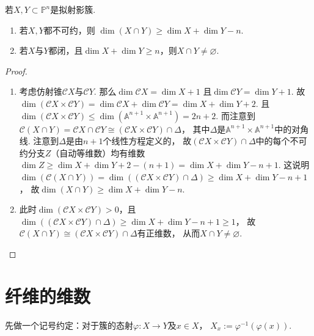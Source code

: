     \begin{corollary}
        若$X,Y \subset \mathbb{P}^{n}$是拟射影簇.
        \begin{enumerate}
            \item[(1)] 若$X,Y$都不可约，则
                       $\dim(X \cap Y) \geq \dim X + \dim Y -n$.
            \item[(2)] 若$X$与$Y$都闭，且$\dim X + \dim Y \geq n$，则$X \cap Y \neq \varnothing$.
        \end{enumerate}
    \end{corollary}
    \begin{proof}
        \begin{enumerate}
            \item[(1)] 考虑仿射锥$\mathcal{C}X$与$\mathcal{C}Y$. 
                       那么$\dim\mathcal{C}X=\dim X+1$
                       且$\dim\mathcal{C}Y=\dim Y+1$.
                       故$\dim(\mathcal{C}X \times \mathcal{C}Y) =\dim\mathcal{C}X + \dim\mathcal{C}Y = \dim X + \dim Y + 2$.
                       且$\dim(\mathcal{C}X \times \mathcal{C}Y) \leq \dim(\mathbb{A}^{n+1}\times\mathbb{A}^{n+1}) = 2n+2$.
                       而注意到$\mathcal{C}(X \cap Y)=\mathcal{C}X \cap \mathcal{C}Y \cong (\mathcal{C}X \times \mathcal{C}Y) \cap \Delta$，
                       其中$\Delta$是$\mathbb{A}^{n+1}\times\mathbb{A}^{n+1}$中的对角线.
                       注意到$\Delta$是由$n+1$个线性方程定义的，
                       故$(\mathcal{C}X \times \mathcal{C}Y) \cap \Delta$中的每个不可约分支$Z$（自动等维数）均有维数
                       $\dim Z \geq \dim X + \dim Y + 2 - (n+1) = \dim X + \dim Y - n + 1$.
                       这说明$\dim(\mathcal{C}(X \cap Y)) = \dim((\mathcal{C}X \times \mathcal{C}Y) \cap \Delta) \geq \dim X + \dim Y - n + 1$，
                       故$\dim(X \cap Y) \geq \dim X + \dim Y - n$.
            \item[(2)] 此时$\dim(\mathcal{C}X \times \mathcal{C}Y) >0$，且
                       $\dim((\mathcal{C}X \times \mathcal{C}Y) \cap \Delta) \geq \dim X + \dim Y - n + 1
                       \geq 1$，
                       故$\mathcal{C}(X \cap Y) \cong (\mathcal{C}X \times \mathcal{C}Y) \cap \Delta$有正维数，
                       从而$X \cap Y \neq \varnothing$.\qedhere
        \end{enumerate}
    \end{proof}


\section{纤维的维数}
    先做一个记号约定：对于簇的态射$\varphi\colon X \rightarrow Y$及$x \in X$，
    $X_{x}:=\varphi^{-1}(\varphi(x))$.

